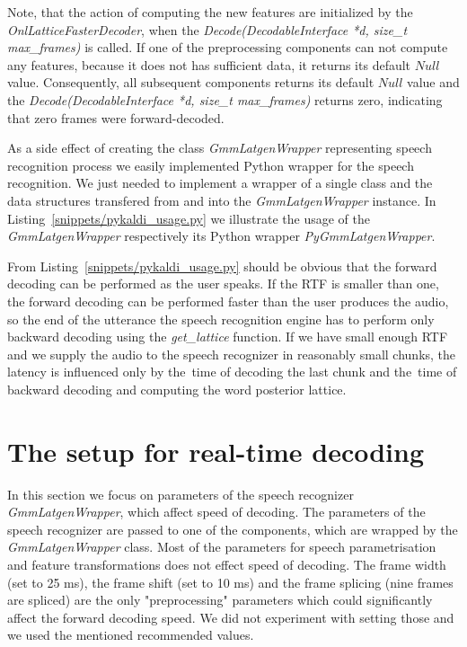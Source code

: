 Note, that the action of computing the new features are initialized by the {\it OnlLatticeFasterDecoder},
when the {\it Decode(DecodableInterface *d, size\_t max\_frames)}\/ is called.
If one of the preprocessing components can not compute any features, 
because it does not has sufficient data, it returns its default $Null$ value. 
Consequently, all subsequent components returns its default $Null$ value and 
the {\it Decode(DecodableInterface *d, size\_t max\_frames)}\/ returns zero,
indicating that zero frames were forward-decoded.

As a side effect of creating the class {\it GmmLatgenWrapper}\/ representing speech recognition process
we easily implemented Python wrapper for the speech recognition. 
We just needed to implement a wrapper of a single class and the data structures transfered from and into the
{\it GmmLatgenWrapper}\/ instance.
In Listing~\ref{snippets/pykaldi_usage.py} we illustrate the usage of the {\it GmmLatgenWrapper}\/
respectively its Python wrapper {\it PyGmmLatgenWrapper}.


From Listing~\ref{snippets/pykaldi_usage.py} should be obvious that 
the forward decoding can be performed as the user speaks.
If the \ac{RTF} is smaller than one, the forward decoding can be performed faster
than the user produces the audio, so the end of the utterance
the speech recognition engine has to perform only backward decoding using 
the {\it get\_lattice}\/ function.
If we have small enough \ac{RTF} and we supply the audio to the speech recognizer
in reasonably small chunks, the latency is influenced only by the~time of decoding the last chunk
and the~time of backward decoding and computing the word posterior lattice.


\section{The setup for real-time decoding}
\label{sec:real-setup}

In this section we focus on parameters of the speech recognizer {\it GmmLatgenWrapper}\/,
which affect speed of decoding.
The parameters of the speech recognizer are passed to one of the components,
which are wrapped by the {\it GmmLatgenWrapper}\/ class.
Most of the parameters for speech parametrisation and feature transformations 
does not effect speed of decoding. 
The frame width (set to 25 ms), the frame shift (set to 10 ms) and
the frame splicing (nine frames are spliced) 
are the only "preprocessing" parameters which could significantly affect the forward decoding speed.
We did not experiment with setting those and we used the mentioned recommended values.

